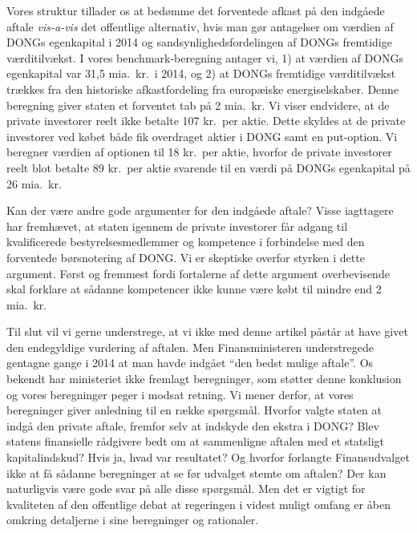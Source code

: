 \documentclass{article}
\begin{document}
Vores struktur tillader os at bedømme det forventede afkast på den indgåede aftale \emph{vis-a-vis} det offentlige alternativ, hvis man gør antagelser om værdien af DONGs egenkapital i 2014 og sandsynlighedsfordelingen af DONGs fremtidige værditilvækst. I vores benchmark-beregning antager vi, 1) at værdien af DONGs egenkapital var 31,5 mia.\ kr.\ i 2014, og 2) at DONGs fremtidige værditilvækst trækkes fra den historiske afkastfordeling fra europæiske energiselskaber. Denne beregning giver staten et forventet tab på 2 mia.\ kr. Vi viser endvidere, at de private investorer reelt ikke betalte 107 kr.\ per aktie. Dette skyldes at de private investorer ved købet både fik overdraget  aktier i DONG samt en put-option. Vi beregner værdien af optionen til 18 kr.\ per aktie, hvorfor de private investorer reelt blot betalte 89 kr.\ per aktie svarende til en værdi på DONGs egenkapital på 26 mia.\ kr. %


Kan der være andre gode argumenter for den indgåede aftale? Visse iagttagere har fremhævet, at staten igennem de private investorer får adgang til kvalificerede bestyrelsesmedlemmer og kompetence i forbindelse med den forventede børsnotering af DONG. Vi er skeptiske overfor styrken i dette argument. Først og fremmest fordi fortalerne af dette argument overbevisende skal forklare at sådanne kompetencer ikke kunne være købt til mindre end 2 mia.\ kr.

Til slut vil vi gerne understrege, at vi ikke med denne artikel påstår at have givet den endegyldige vurdering af aftalen. Men Finansministeren understregede gentagne gange i 2014 at man havde indgået \enquote{den bedst mulige aftale}. 
Os bekendt har ministeriet ikke fremlagt beregninger, som støtter denne konklusion og vores beregninger peger i modsat retning. Vi mener derfor, at vores beregninger giver anledning til en række spørgsmål. Hvorfor valgte staten at indgå den private aftale, fremfor selv at indskyde den ekstra i DONG? Blev statens finansielle rådgivere bedt om at sammenligne aftalen med et statsligt kapitalindskud? Hvis ja, hvad var resultatet? Og hvorfor forlangte Finansudvalget ikke at få  sådanne beregninger at se før udvalget stemte om aftalen? Der kan naturligvis være gode svar på alle disse spørgsmål. Men det er vigtigt for kvaliteten af den offentlige debat at regeringen i videst muligt omfang er åben omkring detaljerne i sine beregninger og rationaler.
\end{document}
